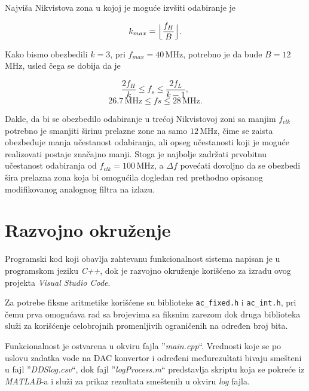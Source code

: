 \documentclass[conference]{IEEEtran}
\DeclarePairedDelimiter{\floor}{\lfloor}{\rfloor}
\begin{document}
Najviša Nikvistova zona u kojoj je moguće izvšiti odabiranje je 

\begin{equation}
k_{max} = \floor[\Big]{\frac{f_H}{B}} .
\end{equation}

\noindent Kako bismo obezbedili $k=3$, pri $f_{max}=40$\,MHz, potrebno je da bude $B=12$\,MHz, usled čega se dobija da je

\begin{equation}
\frac{2f_H}{k}\leq f_s\leq \frac{2f_L}{k-1} ,
\end{equation}
\begin{equation}
26.7\,\text{MHz}\leq fs\leq 28\,\text{MHz} .
\end{equation}

Dakle, da bi se obezbedilo odabiranje u trećoj Nikvistovoj zoni sa manjim $f_{clk}$ potrebno je smanjiti širinu prelazne zone na samo $12$\,MHz, čime se zaista obezbeđuje manja učestanost odabiranja, ali opseg učestanosti koji je moguće realizovati postaje značajno manji. Stoga je najbolje zadržati prvobitnu učestanost odabiranja od $f_{clk}=100$\,MHz, a $\Delta f$ povećati dovoljno da se obezbedi šira prelazna zona koja bi omogućila dogledan red prethodno opisanog modifikovanog analognog filtra na izlazu. 
\bigskip 

\section{Razvojno okruženje}\label{sekcija:okruzenje}
Programski kod koji obavlja zahtevanu funkcionalnost sistema napisan je u programskom jeziku \textit{C++}, dok je razvojno okruženje korišćeno za izradu ovog projekta \textit{Visual Studio Code}.

Za potrebe fiksne aritmetike korišćene su biblioteke \texttt{ac\_fixed.h} i \texttt{ac\_int.h}, pri čemu prva omogućava rad sa brojevima sa fiksnim zarezom dok druga biblioteka služi za korišćenje celobrojnih promenljivih ograničenih na određen broj bita.

Funkcionalnost je ostvarena u okviru fajla ''\textit{main.cpp}``. Vrednosti koje se po uslovu zadatka vode na DAC konvertor i određeni međurezultati bivaju smešteni u fajl ''\textit{DDSlog.csv}``, dok fajl ''\textit{logProcess.m}`` predstavlja skriptu koja se pokreće iz \textit{MATLAB}-a i služi za prikaz rezultata smeštenih u okviru \textit{log} fajla.
\bigskip
\end{document}
